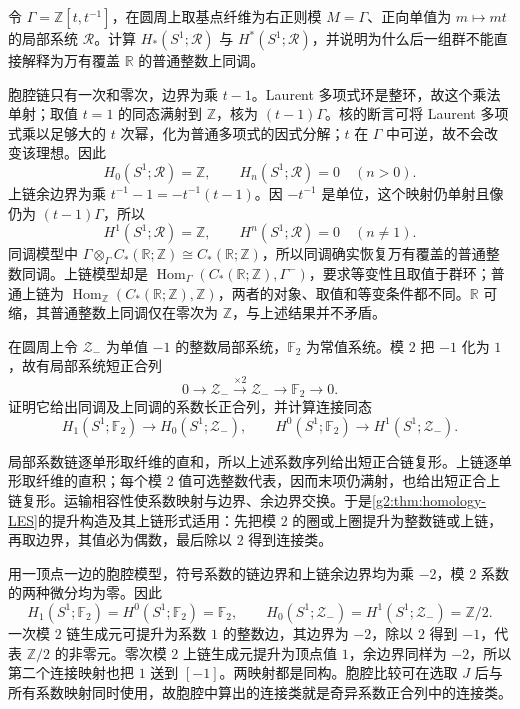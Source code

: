 \begin{exercise}\label{g2:ex:regular-local-coefficients-circle}
	令 \(\Gamma=\mathbb Z[t,t^{-1}]\)，在圆周上取基点纤维为右正则模 \(M=\Gamma\)、正向单值为 \(m\mapsto mt\) 的局部系统 \(\mathcal R\)。计算 \(H_*(S^1;\mathcal R)\) 与 \(H^*(S^1;\mathcal R)\)，并说明为什么后一组群不能直接解释为万有覆盖 \(\mathbb R\) 的普通整数上同调。
\end{exercise}
\begin{solution}
	胞腔链只有一次和零次，边界为乘 \(t-1\)。Laurent 多项式环是整环，故这个乘法单射；取值 \(t=1\) 的同态满射到 \(\mathbb Z\)，核为 \((t-1)\Gamma\)。核的断言可将 Laurent 多项式乘以足够大的 \(t\) 次幂，化为普通多项式的因式分解；\(t\) 在 \(\Gamma\) 中可逆，故不会改变该理想。因此
	\[
		H_0(S^1;\mathcal R)=\mathbb Z,\qquad H_n(S^1;\mathcal R)=0\quad(n>0).
	\]
	上链余边界为乘 \(t^{-1}-1=-t^{-1}(t-1)\)。因 \(-t^{-1}\) 是单位，这个映射仍单射且像仍为 \((t-1)\Gamma\)，所以
	\[
		H^1(S^1;\mathcal R)=\mathbb Z,\qquad H^n(S^1;\mathcal R)=0\quad(n\ne1).
	\]
	同调模型中 \(\Gamma\otimes_\Gamma C_*(\mathbb R;\mathbb Z)\cong C_*(\mathbb R;\mathbb Z)\)，所以同调确实恢复万有覆盖的普通整数同调。上链模型却是 \(\operatorname{Hom}_\Gamma(C_*(\mathbb R;\mathbb Z),\Gamma^-)\)，要求等变性且取值于群环；普通上链为 \(\operatorname{Hom}_{\mathbb Z}(C_*(\mathbb R;\mathbb Z),\mathbb Z)\)，两者的对象、取值和等变条件都不同。\(\mathbb R\) 可缩，其普通整数上同调仅在零次为 \(\mathbb Z\)，与上述结果并不矛盾。
\end{solution}

\begin{exercise}\label{g2:ex:sign-coefficient-connecting}
	在圆周上令 \(\mathcal Z_-\) 为单值 \(-1\) 的整数局部系统，\(\mathbb F_2\) 为常值系统。模 \(2\) 把 \(-1\) 化为 \(1\)，故有局部系统短正合列
	\[
		0\longrightarrow\mathcal Z_-\xrightarrow{\times2}\mathcal Z_-\longrightarrow\mathbb F_2\longrightarrow0.
	\]
	证明它给出同调及上同调的系数长正合列，并计算连接同态
	\[
		H_1(S^1;\mathbb F_2)\longrightarrow H_0(S^1;\mathcal Z_-),\qquad
		H^0(S^1;\mathbb F_2)\longrightarrow H^1(S^1;\mathcal Z_-).
	\]
\end{exercise}
\begin{solution}
	局部系数链逐单形取纤维的直和，所以上述系数序列给出短正合链复形。上链逐单形取纤维的直积；每个模 \(2\) 值可选整数代表，因而末项仍满射，也给出短正合上链复形。运输相容性使系数映射与边界、余边界交换。于是\cref{g2:thm:homology-LES}的提升构造及其上链形式适用：先把模 \(2\) 的圈或上圈提升为整数链或上链，再取边界，其值必为偶数，最后除以 \(2\) 得到连接类。

	用一顶点一边的胞腔模型，符号系数的链边界和上链余边界均为乘 \(-2\)，模 \(2\) 系数的两种微分均为零。因此
	\[
		H_1(S^1;\mathbb F_2)=H^0(S^1;\mathbb F_2)=\mathbb F_2,
		\qquad H_0(S^1;\mathcal Z_-)=H^1(S^1;\mathcal Z_-)=\mathbb Z/2.
	\]
	一次模 \(2\) 链生成元可提升为系数 \(1\) 的整数边，其边界为 \(-2\)，除以 \(2\) 得到 \(-1\)，代表 \(\mathbb Z/2\) 的非零元。零次模 \(2\) 上链生成元提升为顶点值 \(1\)，余边界同样为 \(-2\)，所以第二个连接映射也把 \(1\) 送到 \([-1]\)。两映射都是同构。胞腔比较可在选取 \(J\) 后与所有系数映射同时使用，故胞腔中算出的连接类就是奇异系数正合列中的连接类。
\end{solution}

